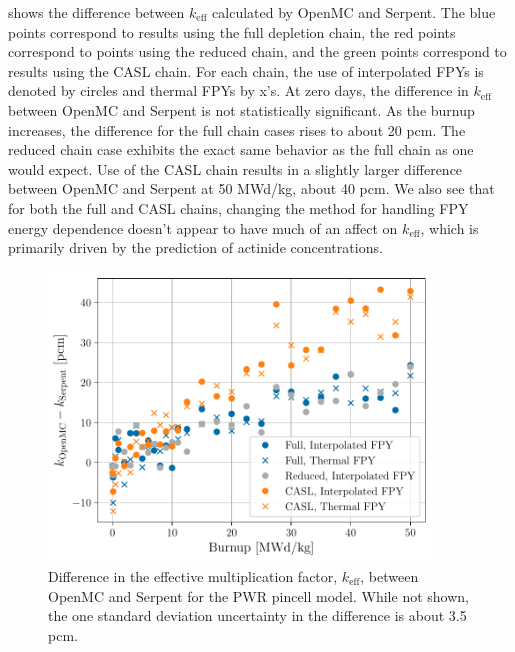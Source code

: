 \documentclass[3p,authoryear]{elsarticle}
\begin{document}
 shows the difference between $k_\text{eff}$ calculated by
OpenMC and Serpent. The blue points correspond to results using the full
depletion chain, the red points correspond to points using the reduced chain,
and the green points correspond to results using the CASL chain. For each chain,
the use of interpolated FPYs is denoted by circles and thermal FPYs by x's. At
zero days, the difference in $k_\text{eff}$ between OpenMC and Serpent is not
statistically significant. As the burnup increases, the difference for the full
chain cases rises to about 20 pcm. The reduced chain case exhibits the exact
same behavior as the full chain as one would expect. Use of the CASL chain
results in a slightly larger difference between OpenMC and Serpent at 50 MWd/kg,
about 40 pcm. We also see that for both the full and CASL chains, changing the
method for handling FPY energy dependence doesn't appear to have much of an
affect on $k_\text{eff}$, which is primarily driven by the prediction of
actinide concentrations.
\begin{figure}[H]
  \centering
  \includegraphics[width=4in]{figures/pwr_keff.pdf}
  \caption{Difference in the effective multiplication factor, $k_\text{eff}$,
  between OpenMC and Serpent for the PWR pincell model. While not shown, the one
  standard deviation uncertainty in the difference is about 3.5 pcm.}
  \label{fig:pwr-keff}
\end{figure}
\end{document}
